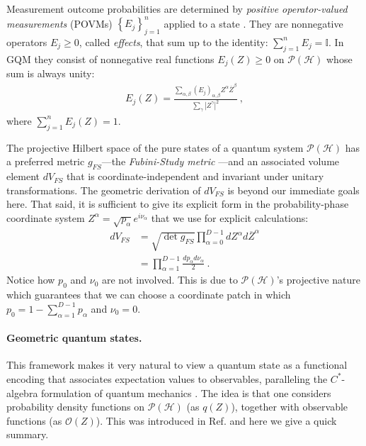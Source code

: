 \documentclass[draft,nofootinbib,pre,twocolumn,showpacs,showkeys,preprintnumbers,floatfix]{revtex4-1}
\newcommand{\1}{\mathbbm{1}}
\begin{document}
Measurement outcome probabilities are determined by \emph{positive
operator-valued measurements} (POVMs) $\left\{E_j\right\}_{j=1}^n$ applied to a
state \cite{Nielsen2010,Heinosaari2012}. They are nonnegative operators
$E_j\geq 0$, called \emph{effects}, that sum up to the identity: $\sum_{j=1}^n
E_j = \mathbb{I}$. In GQM they consist of nonnegative real functions $E_j(Z)\ge
0$ on $\mathcal{P}(\mathcal{H})$ whose sum is always unity:
\begin{align}
E_j(Z) = \frac{\sum_{\alpha,\beta}
  \left(E_j\right)_{\alpha,\beta} Z^\alpha \overline{Z}^\beta}{\sum_{\gamma} \left\vert Z^\gamma \right\vert^2}
  ~,
\label{eq:GQM_POVMs}
\end{align}
where $\sum_{j=1}^{n}E_j(Z) = 1$.

The projective Hilbert space of the pure states of a quantum system $\mathcal{P}(\mathcal{H})$ has a preferred
metric $g_{FS}$---the \emph{Fubini-Study metric} \cite{Bengtsson2017}---and an
associated volume element $dV_{FS}$ that is coordinate-independent and
invariant under unitary transformations. The geometric derivation of $dV_{FS}$
is beyond our immediate goals here. That said, it is sufficient to give its
explicit form in the probability-phase coordinate system $Z^{\alpha} =
\sqrt{p_\alpha}e^{i\nu_\alpha}$ that we use for explicit calculations: 
\begin{align*}
dV_{FS}
  & = \sqrt{\det g_{FS}}
  \prod_{\alpha=0}^{D-1} dZ^\alpha d\overline{Z}^\alpha \\
  & =  \prod_{\alpha=1}^{D-1} \frac{dp_\alpha d\nu_\alpha}{2}
  ~.
\end{align*}
Notice how $p_0$ and $\nu_0$ are not involved. This is due to
$\mathcal{P}(\mathcal{H})$'s projective nature which guarantees that we can
choose a coordinate patch in which $p_0 = 1 - \sum_{\alpha=1}^{D-1}p_\alpha$
and $\nu_0 = 0$.

\paragraph*{Geometric quantum states.}
This framework makes it very natural to view a quantum state as a functional
encoding that associates expectation values to observables, paralleling the
$C^{*}$-algebra formulation of quantum mechanics \cite{Strocchi2008a}. 
The idea is that one considers probability density functions on $\mathcal{P}(\mathcal{H})$ (as $q(Z)$),
together with observable functions (as $\mathcal{O}(Z)$). This was introduced 
in Ref. \cite{Brody2001} and here we give a quick summary.
\end{document}
